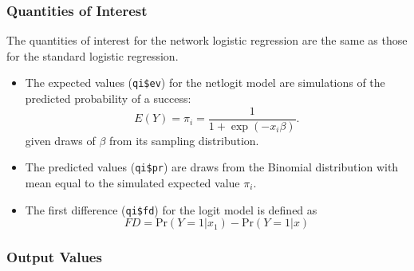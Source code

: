 \subsubsection{Quantities of Interest}
The quantities of interest for the network logistic regression are the
same as those for the standard logistic regression.
\begin{itemize}
\item The expected values ({\tt qi\$ev}) for the netlogit model are
simulations of the predicted probability of a success:   
\begin{equation*}
E(Y) = \pi_{i} = \frac{1}{1 + \exp(-x_{i}\beta)}.
\end{equation*}
given draws of $\beta$ from its sampling distribution.

\item The predicted values ({\tt qi\$pr}) are draws from the Binomial
distribution with mean equal to the simulated expected value
$\pi_{i}$. 

\item The first difference ({\tt qi\$fd}) for the logit model is defined as 
\begin{equation*}
FD = \text{Pr}(Y = 1 | x_{1}) - \text{Pr}(Y = 1| x)
\end{equation*}
\end{itemize}


\subsubsection{Output Values}

